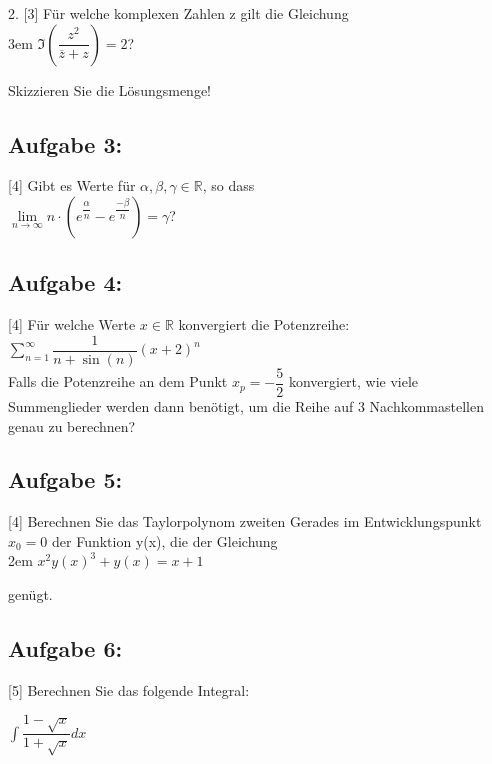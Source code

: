 \documentclass[11pt,final]{scrreprt}
\newcommand{\br} {\medskip\\}
\newcommand{\R} {\mathbb R}
\begin{document}
2. [3] Für welche komplexen Zahlen z gilt die Gleichung\\

\begingroup
\leftskip3em 
$ \Im\left( \dfrac{z^2}{\overline{z}+z} \right) = 2 $?
\par	
\endgroup 

Skizzieren Sie die Lösungsmenge!\br

\subsection*{Aufgabe 3: }

[4] Gibt es Werte für $\alpha, \beta, \gamma \in\R$, so dass \br
\hspace*{2em}$ \lim\limits_{n\to\infty} n\cdot\left( e^{\dfrac{\alpha}{n}}- e^{\dfrac{-\beta}{n}}\right) = \gamma $?\br

\subsection*{Aufgabe 4:}

[4] Für welche Werte $x \in \R$ konvergiert die Potenzreihe:\br
\hspace*{3em}$\sum\limits_{n=1}^\infty \dfrac{1}{n+\sin(n)} (x+2)^n $\br
Falls die Potenzreihe an dem Punkt $x_p=-\dfrac{5}{2}$ konvergiert, wie viele Summenglieder werden dann benötigt, um die Reihe auf 3 Nachkommastellen genau zu berechnen?\br

\subsection*{Aufgabe 5:}

[4] Berechnen Sie das Taylorpolynom zweiten Gerades im Entwicklungspunkt $x_0=0$ der Funktion y(x), die der Gleichung \\

\begingroup
\leftskip2em 
$ x^2y(x)^3+y(x)=x+1 $\\
\par	
\endgroup 

genügt. \br

\subsection*{Aufgabe 6:}

[5] Berechnen Sie das folgende Integral:

\hspace*{2em}$ \int\dfrac{1-\sqrt{x}}{1+\sqrt{x}} dx$\br
\end{document}
